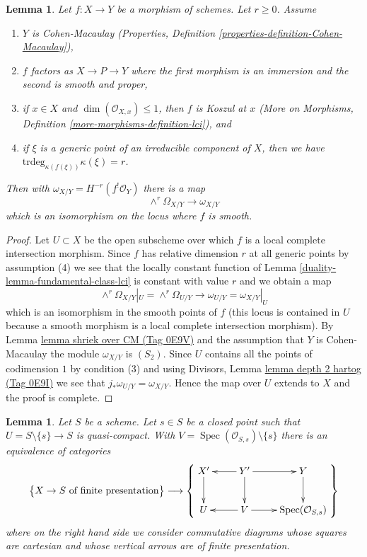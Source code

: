 \documentclass{amsart}
\theoremstyle{plain}
\newtheorem{lemma}[subsection]{Lemma}
\theoremstyle{definition}
\theoremstyle{remark}
\numberwithin{equation}{subsection}
\def\Spec{\mathop{\mathrm{Spec}}}
\begin{document}
\begin{lemma}
\label{duality-lemma-fundamental-class-almost-lci}
Let $f : X \to Y$ be a morphism of schemes. Let $r \geq 0$. Assume
\begin{enumerate}
\item $Y$ is Cohen-Macaulay (Properties, Definition
\ref{properties-definition-Cohen-Macaulay}),
\item $f$ factors as $X \to P \to Y$ where the first morphism is
an immersion and the second is smooth and proper,
\item if $x \in X$ and $\dim(\mathcal{O}_{X, x}) \leq 1$,
then $f$ is Koszul at $x$ (More on Morphisms, Definition
\ref{more-morphisms-definition-lci}), and
\item if $\xi$ is a generic point of an irreducible component of $X$, then
we have
$\text{trdeg}_{\kappa(f(\xi))} \kappa(\xi) = r$.
\end{enumerate}
Then with $\omega_{X/Y} = H^{-r}(f^!\mathcal{O}_Y)$ there is a map
$$
\wedge^r\Omega_{X/Y} \longrightarrow \omega_{X/Y}
$$
which is an isomorphism on the locus where $f$ is smooth.
\end{lemma}

\begin{proof}
Let $U \subset X$ be the open subscheme over which $f$ is a
local complete intersection morphism. Since $f$ has relative
dimension $r$ at all generic points by assumption (4) we
see that the locally constant function of
Lemma \ref{duality-lemma-fundamental-class-lci}
is constant with value $r$ and we obtain a map
$$
\wedge^r\Omega_{X/Y}|_U = \wedge^r \Omega_{U/Y}
\longrightarrow
\omega_{U/Y} = \omega_{X/Y}|_U
$$
which is an isomorphism in the smooth points of $f$ (this locus
is contained in $U$ because a smooth morphism is a local complete
intersection morphism). By Lemma \href{https://stacks.math.columbia.edu/tag/0E9V}{lemma shriek over CM (Tag 0E9V)}
and the assumption that $Y$ is Cohen-Macaulay
the module $\omega_{X/Y}$ is $(S_2)$.
Since $U$ contains all the points of codimension $1$ by condition (3)
and using Divisors, Lemma \href{https://stacks.math.columbia.edu/tag/0E9I}{lemma depth 2 hartog (Tag 0E9I)}
we see that $j_*\omega_{U/Y} = \omega_{X/Y}$.
Hence the map over $U$ extends to $X$ and the proof
is complete.
\end{proof}


\begin{lemma}
\label{limits-lemma-glueing-near-closed-point}
Let $S$ be a scheme. Let $s \in S$ be a closed point such that
$U = S \setminus \{s\} \to S$ is quasi-compact. With
$V = \Spec(\mathcal{O}_{S, s}) \setminus \{s\}$ there is
an equivalence of categories
$$
\left\{
\begin{matrix}
X \to S\text{ of finite presentation}
\end{matrix}
\right\}
\longrightarrow
\left\{
\vcenter{
\xymatrix{
X' \ar[d] & Y' \ar[d] \ar[l] \ar[r] & Y \ar[d] \\
U & V \ar[l] \ar[r] & \Spec(\mathcal{O}_{S, s})
}
}
\right\}
$$
where on the right hand side we consider commutative diagrams
whose squares are cartesian and whose vertical arrows are
of finite presentation.
\end{lemma}
\end{document}
